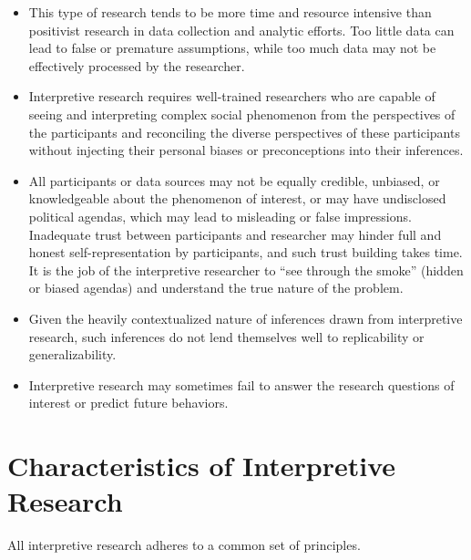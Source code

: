 \begin{itemize}

	\item This type of research tends to be more time and resource intensive than positivist research in data collection and analytic efforts. Too little data can lead to false or premature assumptions, while too much data may not be effectively processed by the researcher.

	\item Interpretive research requires well-trained researchers who are capable of seeing and interpreting complex social phenomenon from the perspectives of the participants and reconciling the diverse perspectives of these participants without injecting their personal biases or preconceptions into their inferences.

	\item All participants or data sources may not be equally credible, unbiased, or knowledgeable about the phenomenon of interest, or may have undisclosed political agendas, which may lead to misleading or false impressions. Inadequate trust between participants and researcher may hinder full and honest self-representation by participants, and such trust building takes time. It is the job of the interpretive researcher to ``see through the smoke'' (hidden or biased agendas) and understand the true nature of the problem.

	\item Given the heavily contextualized nature of inferences drawn from interpretive research, such inferences do not lend themselves well to replicability or generalizability. 

	\item Interpretive research may sometimes fail to answer the research questions of interest or predict future behaviors.

\end{itemize}
\section{Characteristics of Interpretive Research}

All interpretive research adheres to a common set of principles.


